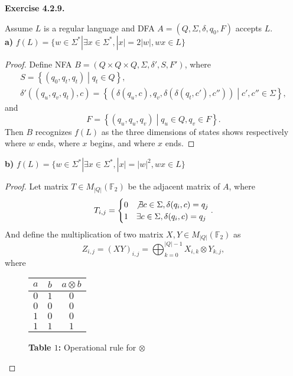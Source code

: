 \documentclass[a4paper]{article}
\newtheorem*{proof}{Proof}
\newenvironment{exercise}[1]{
	\par
	\noindent\textbf{Exercise #1.}\quad
}{
	\par
	\bigskip
}
\newcommand{\Fset}{\mathbb{F}}
\begin{document}
\begin{exercise}{4.2.9}
    Assume $L$ is a regular language and DFA $A=(Q,\Sigma,\delta,q_0,F)$ accepts $L$.\\
    \textbf{a)} $f(L)=\{w\in\Sigma^*|\exists x\in\Sigma^*,|x|=2|w|,wx\in L\}$
    \begin{proof}
    Define NFA $B=(Q\times Q\times Q,\Sigma,\delta',S,F')$, where 
    \begin{gather*}
    S=\left\{(q_0,q_t,q_t)\middle|q_t\in Q\right\},\\
        \delta'\left((q_u,q_v,q_t),c\right)=\left\{\left(\delta(q_u,c),q_v,\delta(\delta(q_t,c'),c'')\right)\middle|c',c''\in\Sigma\right\},
    \end{gather*}
    and 
    $$
    F=\left\{(q_u,q_u,q_v)\middle|q_u\in Q,q_v\in F\right\}.
    $$
    Then $B$ recognizes $f(L)$ as the three dimensions of states shows respectively
    where $w$ ends, where $x$ begins, and where $x$ ends.
    \end{proof}
    \textbf{b)} $f(L)=\{w\in\Sigma^*|\exists x\in\Sigma^*,|x|=|w|^2,wx\in L\}$
    \begin{proof}
        Let matrix $T\in M_{|Q|}(\Fset_2)$ be the adjacent matrix of $A$, where
        $$
        T_{i,j}=\begin{cases}
            0 & \not\exists c\in\Sigma, \delta(q_i,c)=q_j\\
            1 & \exists c\in\Sigma, \delta(q_i,c)=q_j\\
        \end{cases}.
        $$
        And define the multiplication of two
        matrix $X,Y\in M_{|Q|}(\Fset_2)$ as
        $$
        Z_{i,j}=(XY)_{i,j}=\bigoplus_{k=0}^{|Q|-1} X_{i,k}\otimes Y_{k,j},
        $$
        where
        \begin{figure}[ht!]
          \begin{minipage}[b]{0.5\textwidth}
            \centering
            \begin{tabular}{|c|c|c|} \hline
                $a$ & $b$ & $a\otimes b$\\ \hline\hline
                $0$ & $1$ & $0$ \\ \hline
                $0$ & $0$ & $0$ \\ \hline
                $1$ & $0$ & $0$ \\ \hline
                $1$ & $1$ & $1$ \\ \hline
            \end{tabular}
              \caption*{\textbf{Table $1$:} Operational rule for $\otimes$}

\end{minipage}
\end{figure}
\end{proof}
\end{exercise}
\end{document}
